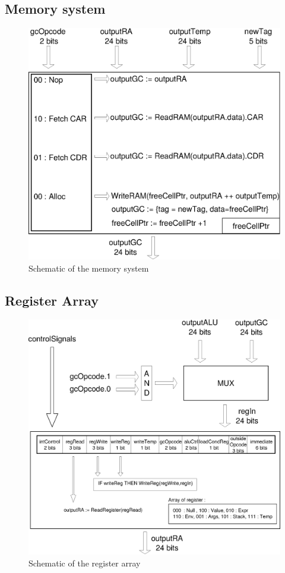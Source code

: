 \documentclass[a4paper, 11pt]{article}
\begin{document}
\newpage
\subsection{Memory system}
\begin{figure}[h]
\center
\caption{Schematic of the memory system}
   \includegraphics[scale=0.5]{GC.eps}
\end{figure}
\newpage
\subsection{Register Array}
\begin{figure}[h]
\center
\caption{Schematic of the register array}
   \includegraphics[scale=0.5]{RA.eps}
\end{figure}
\newpage
\end{document}
